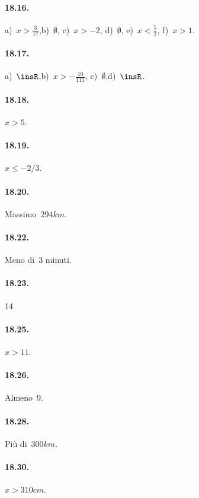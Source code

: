 \paragraph{18.16.} a)~$x>\frac{3}{17}$,\quad b)~$\emptyset$,\quad
c)~$x>-2$, \quad d)~$\emptyset$, \quad e)~$x<\frac{5}{2}$, \quad f)~$x>1$.

\paragraph{18.17.} a)~$\insR$,\quad b)~$x>-{\frac{10}{111}}$,\quad
c)~$\emptyset $,\quad d)~$\insR$.

\begin{multicols}{2}
\paragraph{18.18.} $x>5$.

\paragraph{18.19.} $x\le -2/3$.

\paragraph{18.20.} Massimo~$294\unit{km}$.

\paragraph{18.22.} Meno di~3 minuti.

\paragraph{18.23.} 14

\paragraph{18.25.} $x>11$.

\paragraph{18.26.} Almeno~9.

\paragraph{18.28.} Più di~$300\unit{km}$.

\paragraph{18.30.} $x>310\unit{cm}$.


\end{multicols}
